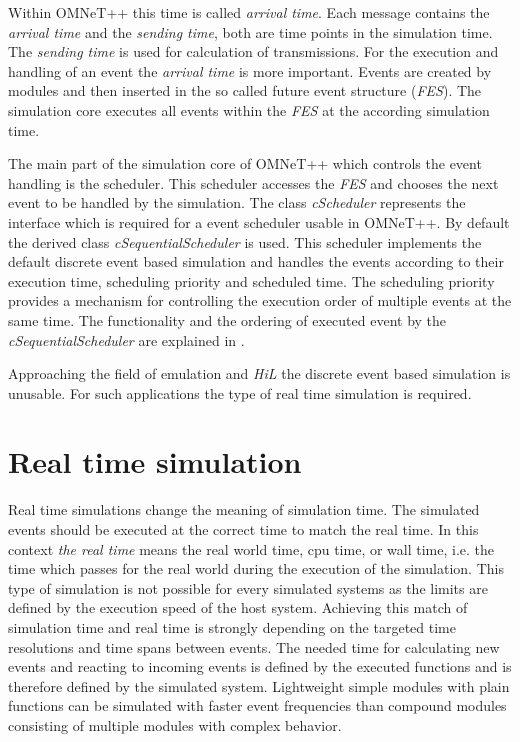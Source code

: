 Within OMNeT++ this time is called \emph{arrival time}.
Each message contains the \emph{arrival time} and the \emph{sending time}, both are time points in the simulation time.
The \emph{sending time} is used for calculation of transmissions.
For the execution and handling of an event the \emph{arrival time} is more important.
Events are created by modules and then inserted in the so called future event structure (\emph{FES}).
The simulation core executes all events within the \emph{FES} at the according simulation time.

The main part of the simulation core of OMNeT++ which controls the event handling is the scheduler.
This scheduler accesses the \emph{FES} and chooses the next event to be handled by the simulation.
The class \emph{cScheduler} represents the interface which is required for a event scheduler usable in OMNeT++.
By default the derived class \emph{cSequentialScheduler} is used.
This scheduler implements the default discrete event based simulation and handles the events according to their execution time, scheduling priority and scheduled time.
The scheduling priority provides a mechanism for controlling the execution order of multiple events at the same time.
The functionality and the ordering of executed event by the \emph{cSequentialScheduler} are explained in \cite[section 4.1]{omnet_manual}.

Approaching the field of emulation and \emph{HiL} the discrete event based simulation is unusable.
For such applications the type of real time simulation is required.

\section{Real time simulation}
\label{sec:simulation_real_time}
Real time simulations change the meaning of simulation time.
The simulated events should be executed at the correct time to match the real time.
In this context \emph{the real time} means the real world time, cpu time, or wall time, i.e. the time which passes for the real world during the execution of the simulation.
This type of simulation is not possible for every simulated systems as the limits are defined by the execution speed of the host system.
Achieving this match of simulation time and real time is strongly depending on the targeted time resolutions and time spans between events.
The needed time for calculating new events and reacting to incoming events is defined by the executed functions and is therefore defined by the simulated system.
Lightweight simple modules with plain functions can be simulated with faster event frequencies than compound modules consisting of multiple modules with complex behavior.

